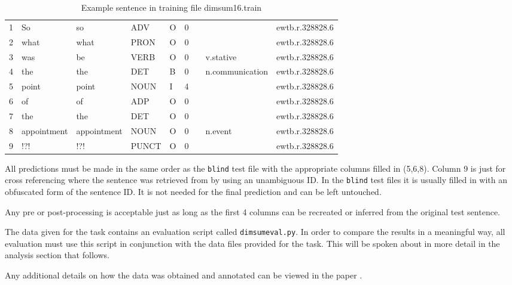 \begin{table}[!htbp]
\small
\begin{framed}
  \centering
  \begin{ttfamily}
  \begin{tabular}{lllllllll}
    1 & So & so & ADV & O & 0 &  &  & ewtb.r.328828.6\\
    2 & what & what & PRON & O & 0 &  &  & ewtb.r.328828.6\\
    3 & was & be & VERB & O & 0 &  & v.stative & ewtb.r.328828.6\\
    4 & the & the & DET & B & 0 &  & n.communication & ewtb.r.328828.6\\
    5 & point & point & NOUN & I & 4 &  &  & ewtb.r.328828.6\\
    6 & of & of & ADP & O & 0 &  &  & ewtb.r.328828.6\\
    7 & the & the & DET & O & 0 &  &  & ewtb.r.328828.6\\
    8 & appointment & appointment & NOUN & O & 0 &  & n.event & ewtb.r.328828.6\\
    9 & !?! & !?! & PUNCT & O & 0 &  &  & ewtb.r.328828.6\\
  \end{tabular}
  \end{ttfamily}
  \caption{Example sentence in \dimsum training file dimsum16.train}
  \label{tab:dimsumsentence}
\end{framed}
\end{table}

All predictions must be made in the same order as the \texttt{blind} test file with the appropriate columns filled in (5,6,8). Column 9 is just for cross referencing where the sentence was retrieved from by using an unambiguous ID. In the \texttt{blind} test files it is usually filled in with an obfuscated form of the sentence ID. It is not needed for the final prediction and can be left untouched. 

Any pre or post-processing is acceptable just as long as the first 4 columns can be recreated or inferred from the original test sentence.

The data given for the \dimsum task contains an evaluation script called \texttt{dimsumeval.py}. In order to compare the results in a meaningful way, all evaluation must use this script in conjunction with the data files provided for the task. This will be spoken about in more detail in the analysis section that follows.

Any additional details on how the data was obtained and annotated can be viewed in the paper \cite{Schneider2015}.

